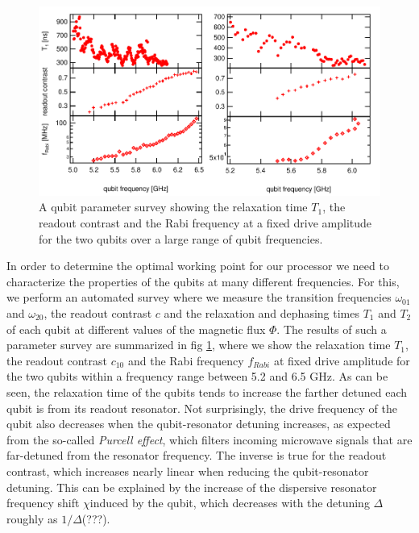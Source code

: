 \begin{figure}[ht!]
   \centering
	 \includegraphics[width=1\textwidth]{"./data/ct5/qubits - parameter surveys/qubit parameters"}
	 \caption[A qubit parameter survey showing $T_1$, readout contrast and Rabi frequency of the two qubits over a large range of qubit frequencies]{A qubit parameter survey showing the relaxation time $T_1$, the readout contrast and the Rabi frequency at a fixed drive amplitude for the two qubits over a large range of qubit frequencies.}
	 \label{fig:qubit_parameters}
\end{figure}

In order to determine the optimal working point for our processor we need to characterize the properties of the qubits at many different frequencies. For this, we perform an automated survey where we measure the transition frequencies $\omega_{01}$ and $\omega_{20}$, the readout contrast $c$ and the relaxation and dephasing times $T_1$ and $T_2$ of each qubit at different values of the magnetic flux $\Phi$. The results of such a parameter survey are summarized in fig \ref{fig:qubit_parameters}, where we show the relaxation time $T_1$,  the readout contrast $c_{10}$ and the Rabi frequency $f_{Rabi}$ at fixed drive amplitude for the two qubits within a frequency range between 5.2 and 6.5 GHz. As can be seen, the relaxation time of the qubits tends to increase the farther detuned each qubit is from its readout resonator. Not surprisingly, the drive frequency of the qubit also decreases when the qubit-resonator detuning increases, as expected from the so-called {\it Purcell effect}, which filters incoming microwave signals that are far-detuned from the resonator frequency. The inverse is true for the readout contrast, which increases nearly linear when reducing the qubit-resonator detuning. This can be explained by the increase of the dispersive resonator frequency shift $\chi$induced by the qubit, which decreases with the detuning $\Delta$ roughly as $1/\Delta$(???).

